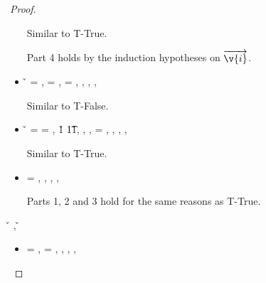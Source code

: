 \begin{lemma}
\begin{proof}
\begin{case}[B-Val]
\begin{itemize}
\begin{subcase}[T-Instance]
        Similar to T-True.

        Part 4 holds by the induction hypotheses on ${\overrightarrow{\v{i}}}$.
      \end{subcase}
  \item[] 
    \begin{subcase}[T-Nil] 
      \v{} = \nil{},
\ep{} = \nil, 
\e{} = \nil, 
\issubtypein{}{\Nil}{\t{}},
\inpropenv{\botprop{}}{\thenprop{\prop{}}},
\inpropenv{\topprop{}}{\elseprop{\prop{}}},
\issubtypein{}{\emptyobject{}}{\object{}}

      Similar to T-False.
\end{subcase}
\item[]
\begin{subcase}[T-Multi] 
  \v{} = { {}}
  \ep{} = { {}},
  \judgementtworewrite {} {\v{1}} {\t{1}}{\v{1}},
  ,
  ,
  \e{} = { {}},
  ,
  \inpropenv{\topprop{}}{\thenprop{\prop{}}},
  \inpropenv{\botprop{}}{\elseprop{\prop{}}},
  \issubtypein{}{\emptyobject{}}{\object{}}

        Similar to T-True.
\end{subcase}
\item[]
\begin{subcase}[T-Const]
  \e{} = {\const{}},
  \issubtypein{}{\constanttype{\const{}}}{\t{}},
  \inpropenv{\topprop{}}{\thenprop{\prop{}}},
  \inpropenv{\botprop{}}{\elseprop{\prop{}}},
  \issubobjin{}{\emptyobject{}}{\object{}}

        Parts 1, 2 and 3 hold for the same reasons as T-True. 
\end{subcase}


  \end{itemize}
\end{case}



\begin{case}[B-Local]
{ \inopenv {\openv{}} {\x{}} {\v{}} },
{ \opsem {\openv{}} {\x{}} {\v{}} }

\begin{itemize}
  \item[]
\begin{subcase}[T-Local]
  \ep{} = \x{}, 
  \e{} = \x{}, 
  \inpropenv{\notprop {\falsy{}} {\x{}}}{\thenprop{\prop{}}},
  \inpropenv{\isprop {\falsy{}} {\x{}}}{\elseprop{\prop{}}},
\issubtypein{}{\x{}}{\object{}},
\inpropenv{\propenv{}}{\isprop{\t{}}{\x{}}}


\end{subcase}
\end{itemize}
\end{case}
\end{proof}
\end{lemma}
